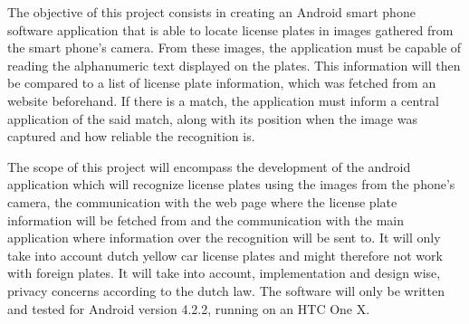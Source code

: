 
The objective of this project consists in creating an Android smart phone software application that is able to locate license plates in images gathered from the smart phone's camera. From these images, the application must be capable of reading the alphanumeric text displayed on the plates. This information will then be compared to a list of license plate information, which was fetched from an website beforehand. If there is a match, the application must inform a central application of the said match, along with its position when the image was captured and how reliable the recognition is.


The scope of this project will encompass the development of the android application which will recognize license plates using the images from the phone's camera, the communication with the web page where the license plate information will be fetched from and the communication with the main application where information over the recognition will be sent to. It will only take into account dutch yellow car license plates and might therefore not work with foreign plates.
It will take into account, implementation and design wise, privacy concerns according to the dutch law.
The software will only be written and tested for Android version 4.2.2, running on an HTC One X.
